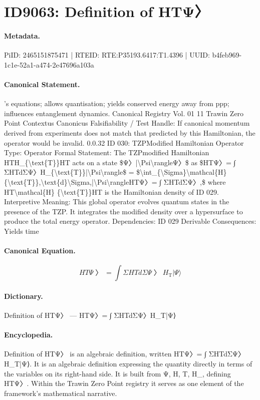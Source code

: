 \section*{ID9063: Definition of HTΨ〉}
\paragraph{Metadata.}
PiID: 2465151875471 | RTEID: RTE:P35193.6417:T1.4396 | UUID: b4feb969-1c1e-52a1-a474-2e47696a103a

\paragraph{Canonical Statement.}
’s equations; allows quantisation; yields conserved energy away from ppp; influences entanglement dynamics. Canonical Registry Vol. 01 11 Trawin Zero Point Contextus Canonicus Falsifiability / Test Handle: If canonical momentum derived from experiments does not match that predicted by this Hamiltonian, the operator would be invalid. 0.0.32 ID 030: TZPModified Hamiltonian Operator Type: Operator Formal Statement: The TZPmodified Hamiltonian HTH\_\{\textbackslash{}text\{T\}\}HT acts on a state \$Ψ〉|\textbackslash{}Psi\textbackslash{}rangleΨ〉\$ as \$HTΨ〉= ∫ ΣHTdΣΨ〉H\_\{\textbackslash{}text\{T\}\}|\textbackslash{}Psi\textbackslash{}rangle\$ = \$\textbackslash{}int\_\{\textbackslash{}Sigma\}\textbackslash{}mathcal\{H\} \{\textbackslash{}text\{T\}\},\textbackslash{}text\{d\}\textbackslash{}Sigma,|\textbackslash{}Psi\textbackslash{}rangleHTΨ〉= ∫ ΣHTdΣΨ〉,\$ where HT\textbackslash{}mathcal\{H\} \{\textbackslash{}text\{T\}\}HT is the Hamiltonian density of ID 029. Interpretive Meaning: This global operator evolves quantum states in the presence of the TZP. It integrates the modified density over a hypersurface to produce the total energy operator. Dependencies: ID 029 Derivable Consequences: Yields time

\paragraph{Canonical Equation.}
\[
HTΨ〉= ∫ ΣHTdΣΨ〉H_{\text{T}}|\Psi\rangle
\]

\paragraph{Dictionary.}
Definition of HTΨ〉 — HTΨ〉= ∫ ΣHTdΣΨ〉H\_T|Ψ⟩

\paragraph{Encyclopedia.}
Definition of HTΨ〉 is an algebraic definition, written HTΨ〉= ∫ ΣHTdΣΨ〉H\_T|Ψ⟩. It is an algebraic definition expressing the quantity directly in terms of the variables on its right-hand side. It is built from Ψ, H, T, H\_, defining HTΨ〉. Within the Trawin Zero Point registry it serves as one element of the framework's mathematical narrative.
